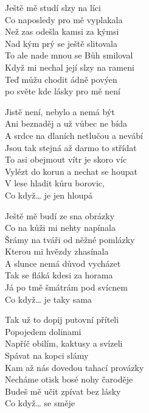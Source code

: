 
\ve{}
Ještě mě studí slzy na líci\\
Co naposledy pro mě vyplakala\\
Než zas odešla kamsi za kýmsi\\
Nad kým prý se ještě slitovala\\
To ale nade mnou se Bůh smiloval\\
Když mi nechal její slzy na rameni\\
Teď můžu chodit ádně povýen\\
po světe kde lásky pro mě není

\vspace{-2pt}
\ve{}
Jistě není, nebylo a nemá být\\
Ani beznaděj a už vůbec ne bída\\
A srdce na dlaních netlučou a nevábí\\
Jsou tak stejná až darmo to střídat\\
To asi obejmout vítr je skoro víc\\
Vylézt do korun a nechat se houpat\\
V lese hladit kůru borovic,\\
Co když\ldots{} \hspace{6em} je jen hloupá

\vspace{-2pt}
\ve{}
Ještě mě budí ze sna obrázky\\
Co na kůži mi nehty napínala\\
Šrámy na tváři od něžné pomlázky\\
Kterou mi hvězdy zhasínala\\
A slunce nemá důvod vycházet\\
Tak se fláká kdesi za horama\\
Já po tmě šmátrám pod svícnem\\
Co když\ldots{} je taky sama

\vspace{-2pt}
\ve{}
Tak už to dopij putovní příteli\\
Popojedem dolinami\\
Napříč obilím, kaktusy a svízeli\\
Spávat na kopci slámy\\
Kam až nás dovedou tahací provázky\\
Necháme otisk bosé nohy čaroděje\\
Budeš mě učit zpívat bez lásky\\
Co když\ldots{} se směje

\esong{}